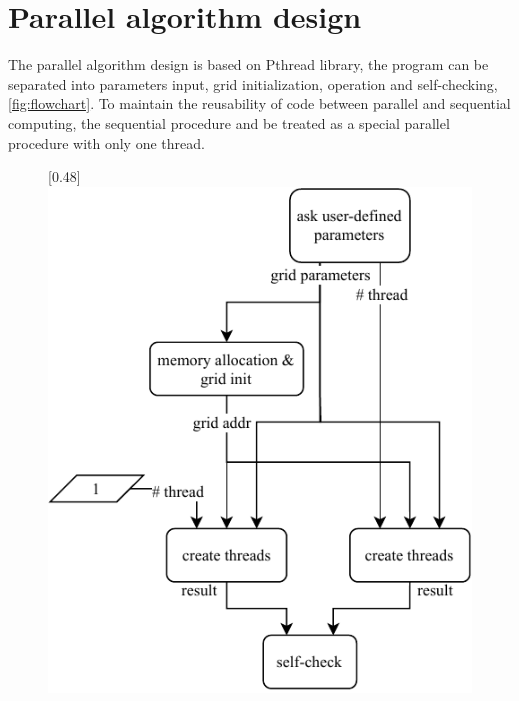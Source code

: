\documentclass[12pt]{article}
\begin{document}
\section{Parallel algorithm design}
The parallel algorithm design is based on Pthread library, the program can be separated into parameters input, grid initialization, operation and self-checking, \autoref{fig:flowchart}. To maintain the reusability of code between parallel and sequential computing, the sequential procedure and be treated as a special parallel procedure with only one thread. 
\begin{figure}[ht]
    \centering
    [0.48\textwidth]{\includegraphics[width=0.9\linewidth]{main.pdf}}

\end{figure}
\end{document}

